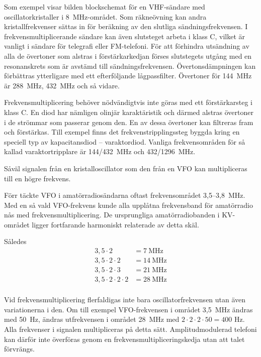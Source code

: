 Som exempel visar bilden blockschemat för en VHF-sändare med
oscillatorkristaller i 8~MHz-området.
Som räkneövning kan andra kristallfrekvenser sättas in för beräkning av den
slutliga sändningsfrekvensen.
I frekvensmultiplicerande sändare kan även slutsteget arbeta i klass C, vilket
är vanligt i sändare för telegrafi eller FM-telefoni.
För att förhindra utsändning av alla de övertoner som alstras i
förstärkarkedjan förses slutstegets utgång med en resonanskrets som är
avstämd till sändningsfrekvensen.
Övertonsdämpningen kan förbättras ytterligare med ett efterföljande
lågpassfilter.
Övertoner för 144~MHz är 288~MHz, 432~MHz och så vidare.

Frekvensmultiplicering behöver nödvändigtvis inte göras med ett förstärkarsteg
i klass C.
En diod har nämligen olinjär karaktäristik och därmed alstras övertoner i
de strömmar som passerar genom den.
En av dessa övertoner kan filtreras fram och förstärkas.
Till exempel finns det frekvenstripplingssteg byggda kring en speciell typ av
kapacitansdiod -- varaktordiod.
Vanliga frekvensområden för så kallad varaktortripplare är 144/432~MHz och
432/1296~MHz.

Såväl signalen från en kristalloscillator som den från en VFO kan
multipliceras till en högre frekvens.

Förr täckte VFO i amatörradiosändarna oftast frekvensområdet 3,5--3,8~MHz.
Med en så vald VFO-frekvens kunde alla upplåtna frekvensband för
amatörradio nås med frekvensmultiplicering.
De ursprungliga amatörradiobanden i KV-området ligger fortfarande harmoniskt
relaterade av detta skäl.

Således
\begin{align*}
  3,5 \cdot 2 & = 7\ \text{MHz} \\
  3,5 \cdot 2 \cdot 2 & = 14\ \text{MHz} \\
  3,5 \cdot 2 \cdot 3 & = 21\ \text{MHz} \\
  3,5 \cdot 2 \cdot 2 \cdot 2 & = 28\ \text{MHz} \\
\end{align*}

Vid frekvensmultiplicering flerfaldigas inte bara oscillatorfrekvensen utan
även variationerna i den.
Om till exempel VFO-frekvensen i området 3,5~MHz ändras med 50~Hz, ändras
utfrekvensen i området 28~MHz med \(2 \cdot 2 \cdot 2 \cdot 50 = 400\) Hz.
Alla frekvenser i signalen multipliceras på detta sätt.
Amplitudmodulerad telefoni kan därför inte överföras genom en
frekvensmultipliceringskedja utan att talet förvrängs.

